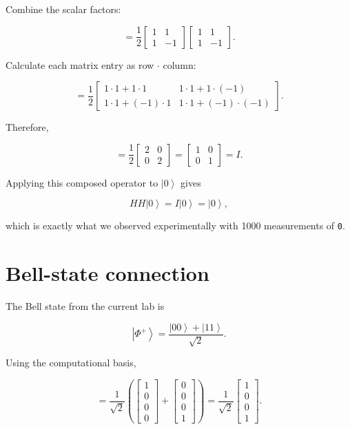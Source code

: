 \documentclass[11pt,a4paper]{article}
\newcommand{\ket}[1]{\left|#1\right\rangle}
\begin{document}
Combine the scalar factors:

\[
=
\frac{1}{2}
\begin{bmatrix}
1 & 1\\
1 & -1
\end{bmatrix}
\begin{bmatrix}
1 & 1\\
1 & -1
\end{bmatrix}.
\]

Calculate each matrix entry as row $\cdot$ column:

\[
=
\frac{1}{2}
\begin{bmatrix}
1\cdot1+1\cdot1 &
1\cdot1+1\cdot(-1)
\\[4pt]
1\cdot1+(-1)\cdot1 &
1\cdot1+(-1)\cdot(-1)
\end{bmatrix}.
\]

Therefore,

\[
=
\frac{1}{2}
\begin{bmatrix}
2 & 0\\
0 & 2
\end{bmatrix}
=
\begin{bmatrix}
1 & 0\\
0 & 1
\end{bmatrix}
=
I.
\]

Applying this composed operator to $\ket{0}$ gives

\[
HH\ket{0}
=
I\ket{0}
=
\ket{0},
\]

which is exactly what we observed experimentally with 1000 measurements of
\texttt{0}.

\section{Bell-state connection}

The Bell state from the current lab is

\[
\ket{\Phi^+}
=
\frac{\ket{00}+\ket{11}}{\sqrt{2}}.
\]

Using the computational basis,

\[
=
\frac{1}{\sqrt{2}}
\left(
\begin{bmatrix}
1\\0\\0\\0
\end{bmatrix}
+
\begin{bmatrix}
0\\0\\0\\1
\end{bmatrix}
\right)
=
\frac{1}{\sqrt{2}}
\begin{bmatrix}
1\\0\\0\\1
\end{bmatrix}.
\]
\end{document}
